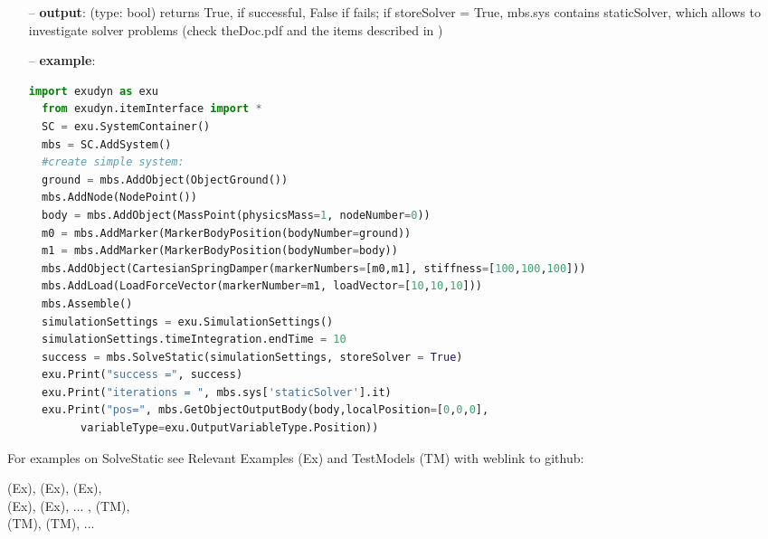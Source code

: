 \begin{itemize}[leftmargin=0.7cm]
\begin{itemize}[leftmargin=1.2cm]
\end{itemize}
\item[--]
{\bf output}: (type: bool) returns True, if successful, False if fails; if storeSolver = True, mbs.sys contains staticSolver, which allows to investigate solver problems (check theDoc.pdf  and the items described in )
\item[--]
{\bf example}: \vspace{-12pt}\ei\begin{lstlisting}[language=Python, xleftmargin=36pt]
  import exudyn as exu
  from exudyn.itemInterface import *
  SC = exu.SystemContainer()
  mbs = SC.AddSystem()
  #create simple system:
  ground = mbs.AddObject(ObjectGround())
  mbs.AddNode(NodePoint())
  body = mbs.AddObject(MassPoint(physicsMass=1, nodeNumber=0))
  m0 = mbs.AddMarker(MarkerBodyPosition(bodyNumber=ground))
  m1 = mbs.AddMarker(MarkerBodyPosition(bodyNumber=body))
  mbs.AddObject(CartesianSpringDamper(markerNumbers=[m0,m1], stiffness=[100,100,100]))
  mbs.AddLoad(LoadForceVector(markerNumber=m1, loadVector=[10,10,10]))
  mbs.Assemble()
  simulationSettings = exu.SimulationSettings()
  simulationSettings.timeIntegration.endTime = 10
  success = mbs.SolveStatic(simulationSettings, storeSolver = True)
  exu.Print("success =", success)
  exu.Print("iterations = ", mbs.sys['staticSolver'].it)
  exu.Print("pos=", mbs.GetObjectOutputBody(body,localPosition=[0,0,0],
        variableType=exu.OutputVariableType.Position))
\end{lstlisting}\vspace{-24pt}\bi\item[]\vspace{-24pt}\vspace{12pt}\end{itemize}
%

%
\noindent For examples on SolveStatic see Relevant Examples (Ex) and TestModels (TM) with weblink to github:
\bi
 \item \footnotesize {} (Ex), 
 (Ex), 
 (Ex), 
\\  (Ex), 
 (Ex), 
 ...
, 
 (TM), 
\\  (TM), 
 (TM), 
 ...


